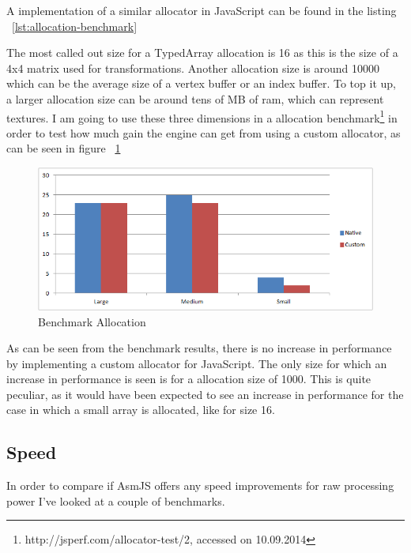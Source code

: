 A implementation of a similar allocator in JavaScript can be found in the listing ~\ref{lst:allocation-benchmark}

\lstset{caption=Allocation benchmark (allocator.js), label=lst:allocation-benchmark}


The most called out size for a TypedArray allocation is 16 as this is the size of a 4x4 matrix used for transformations. Another allocation size is around 10000 which can be the average size of a vertex buffer or an index buffer. To top it up, a larger allocation size can be around tens of MB of ram, which can represent textures. I am going to use these three dimensions in a allocation benchmark\footnote{http://jsperf.com/allocator-test/2, accessed on 10.09.2014} in order to test how much gain the engine can get from using a custom allocator, as can be seen in figure ~\ref{img:chart1}

\begin{center}
	\begin{figure}[here!]
		
		\includegraphics[width=\textwidth]{src/img/chart1.png}
		\caption{Benchmark Allocation}
		\label{img:chart1}
	\end{figure}
\end{center}

As can be seen from the benchmark results, there is no increase in performance by implementing a custom allocator for JavaScript. The only size for which an increase in performance is seen is for a allocation size of 1000. This is quite peculiar, as it would have been expected to see an increase in performance for the case in which a small array is allocated, like for size 16.

\subsection{Speed}

In order to compare if AsmJS offers any speed improvements for raw processing power I've looked at a couple of benchmarks.

